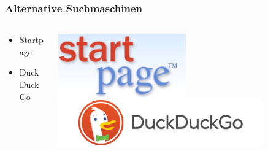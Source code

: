 \documentclass[12pt]{beamer}
\begin{document}
\begin{frame}
    \frametitle{Alternative Suchmaschinen}
    \begin{columns}
        \begin{column}{5cm}
            \begin{center}
                    \begin{itemize}
                            \item Startpage
                            \vspace{2cm}
                            \item DuckDuckGo
                    \end{itemize}
            \end{center}
        \end{column}
        \begin{column}{5cm}
            \begin{center}
                \includegraphics[width=0.5\textwidth]{img/startp_logo.png}
                \vspace{1cm}
                \includegraphics[width=0.8\textwidth]{img/duckduckgo.pdf}
            \end{center}
        \end{column}
    \end{columns}
\end{frame}
\end{document}
